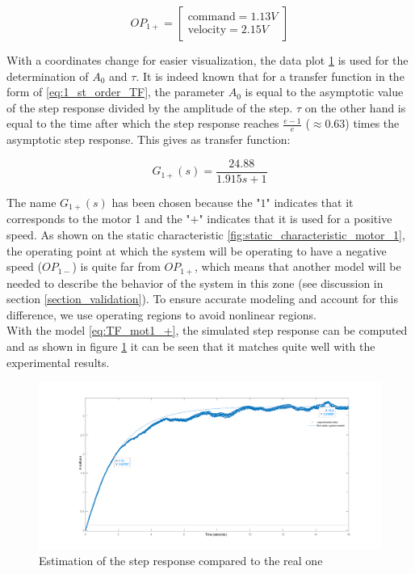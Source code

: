 \begin{equation}
    OP_{1+} = \begin{bmatrix}
        \text{command} = 1.13 V \\
        \text{velocity} = 2.15 V
    \end{bmatrix}
\end{equation}

With a coordinates change for easier visualization, the data plot \ref{fig:estimated_step_response_positive_motor_1} is 
used for the determination of $A_0$ and $\tau$. It is indeed known that for a transfer function in the form of 
\ref{eq:1_st_order_TF}, the parameter $A_0$ is equal to the asymptotic value of the step response divided by the amplitude 
of the step. $\tau$ on the other hand is equal to the time after which the step response reaches $\frac{e-1}{e}$ ($\approx 0.63$)
times the asymptotic step response. This gives as transfer function:

\begin{equation}
    G_{1+}(s) = \frac{24.88}{1.915s + 1}
    \label{eq:TF_mot1_+}
\end{equation}

The name $G_{1+}(s)$ has been chosen because the "\textit{$1$}" indicates that it corresponds to the motor 1 and the 
"\textit{$+$}" indicates that it is used for a positive speed. As shown on the static characteristic 
\ref{fig:static_characteristic_motor_1}, the operating point at which the system will be operating to have a negative speed 
($OP_{1-}$) is quite far from $OP_{1+}$, which means that another model will be needed to describe the behavior of the 
system in this zone (see discussion in section \ref{section_validation}). To ensure accurate modeling and account for this difference, we use operating regions to avoid nonlinear regions.\\

With the model \ref{eq:TF_mot1_+}, the simulated step response can be computed and as shown in figure 
\ref{fig:estimated_step_response_positive_motor_1} it can be seen that it matches quite well with the experimental results.

\begin{figure}[H]
    \centering
    \includegraphics[width=\textwidth]{Pictures/first_order_model_positive_motor_1.png}
    \caption{Estimation of the step response compared to the real one}
    \label{fig:estimated_step_response_positive_motor_1}
\end{figure}

